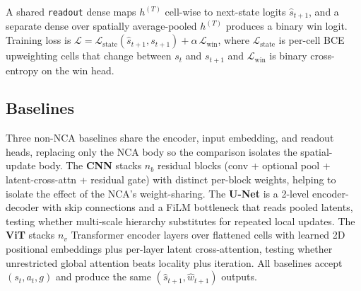 A shared \texttt{readout} dense maps $h^{(T)}$ cell-wise to next-state logits $\widehat{s}_{t+1}$, and a separate dense over spatially average-pooled $h^{(T)}$ produces a binary win logit.
Training loss is $\mathcal{L} = \mathcal{L}_{\text{state}}(\widehat{s}_{t+1}, s_{t+1}) + \alpha\,\mathcal{L}_{\text{win}}$, where $\mathcal{L}_{\text{state}}$ is per-cell BCE upweighting cells that change between $s_t$ and $s_{t+1}$ and $\mathcal{L}_{\text{win}}$ is binary cross-entropy on the win head.

\subsection{Baselines}

Three non-NCA baselines share the encoder, input embedding, and
readout heads, replacing only the NCA body so the comparison
isolates the spatial-update body. The \textbf{CNN} stacks $n_b$
residual blocks (conv + optional pool + latent-cross-attn + residual
gate) with distinct per-block weights, helping to isolate the effect of the NCA's weight-sharing. The \textbf{U-Net}
is a 2-level encoder-decoder with skip connections and a FiLM
bottleneck that reads pooled latents, testing whether multi-scale
hierarchy substitutes for repeated local updates. The \textbf{ViT}
stacks $n_v$ Transformer encoder layers over flattened cells with
learned 2D positional embeddings plus per-layer latent cross-attention,
testing whether unrestricted global attention beats locality plus
iteration. All baselines accept $(s_t, a_t, g)$ and produce the same
$(\widehat{s}_{t+1}, \widehat{w}_{t+1})$ outputs.

